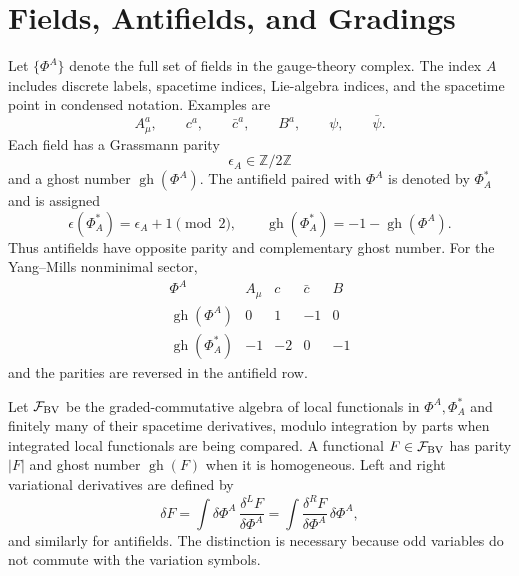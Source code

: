 \section{Fields, Antifields, and Gradings}

Let \(\{\Phi^A\}\) denote the full set of fields in the gauge-theory complex.
The index \(A\) includes discrete labels, spacetime indices, Lie-algebra
indices, and the spacetime point in condensed notation.  Examples are
\[
  A_\mu^a,\qquad c^a,\qquad \bar c^a,\qquad B^a,
  \qquad \psi,\qquad \bar\psi .
\]
Each field has a Grassmann parity
\[
  \epsilon_A\in\mathbb Z/2\mathbb Z
\]
and a ghost number \(\operatorname{gh}(\Phi^A)\).  The antifield paired with
\(\Phi^A\) is denoted by \(\Phi^*_A\) and is assigned
\[
  \epsilon(\Phi^*_A)=\epsilon_A+1\pmod 2,
  \qquad
  \operatorname{gh}(\Phi^*_A)=-1-\operatorname{gh}(\Phi^A).
\]
Thus antifields have opposite parity and complementary ghost number.  For the
Yang--Mills nonminimal sector,
\[
\begin{array}{c|cccc}
  \Phi^A & A_\mu & c & \bar c & B\\ \hline
  \operatorname{gh}(\Phi^A) & 0 & 1 & -1 & 0\\
  \operatorname{gh}(\Phi^*_A) & -1 & -2 & 0 & -1
\end{array}
\]
and the parities are reversed in the antifield row.

Let \(\mathcal F_{\rm BV}\) be the graded-commutative algebra of local
functionals in \(\Phi^A,\Phi^*_A\) and finitely many of their spacetime
derivatives, modulo integration by parts when integrated local functionals are
being compared.  A functional \(F\in\mathcal F_{\rm BV}\) has parity
\(|F|\) and ghost number \(\operatorname{gh}(F)\) when it is homogeneous.
Left and right variational derivatives are defined by
\[
  \delta F
  =
  \int
  \delta\Phi^A\,
  \frac{\delta^L F}{\delta\Phi^A}
  =
  \int
  \frac{\delta^R F}{\delta\Phi^A}\,
  \delta\Phi^A ,
\]
and similarly for antifields.  The distinction is necessary because odd
variables do not commute with the variation symbols.

